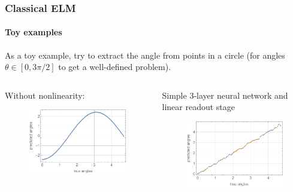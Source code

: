 \documentclass{beamer}
\begin{document}
\begin{frame}
\frametitle{Classical ELM}
\framesubtitle{Toy examples}
As a toy example, try to extract the angle from points in a circle (for angles $\theta\in[0,3\pi/2]$ to get a well-defined problem).
\\[10pt]

\begin{columns}
    \begin{column}{0.48\textwidth}
        Without nonlinearity:
        \\[6pt]
        \begin{figure}
            \hspace{-50pt}
            \includegraphics[width=\linewidth]{figures/ELMforanglesprediction_onlylinear.pdf}
        \end{figure}
    \end{column}
    \hspace{-50pt}
    \vrule{}
    \begin{column}{0.48\textwidth}
        \centering
        Simple 3-layer neural network and linear readout stage
        \begin{figure}
            \centering
            \includegraphics[width=\linewidth]{figures/ELMforanglesprediction.pdf}
        \end{figure}
    \end{column}
\end{columns}



\end{frame}
\end{document}
